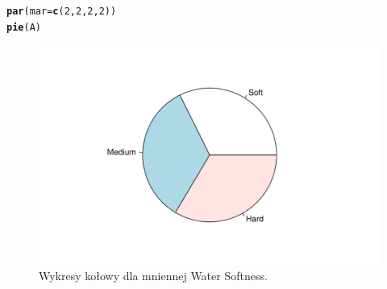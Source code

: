 \documentclass[12pt]{mwart}\usepackage[]{graphicx}\usepackage[]{color}
\makeatletter
\def\maxwidth{ %
  \ifdim\Gin@nat@width>\linewidth
    \linewidth
  \else
    \Gin@nat@width
  \fi
}
\newcommand{\hlnum}[1]{\textcolor[rgb]{0.686,0.059,0.569}{#1}}%
\newcommand{\hlstd}[1]{\textcolor[rgb]{0.345,0.345,0.345}{#1}}%
\newcommand{\hlkwc}[1]{\textcolor[rgb]{0.333,0.667,0.333}{#1}}%
\newcommand{\hlkwd}[1]{\textcolor[rgb]{0.737,0.353,0.396}{\textbf{#1}}}%
\newenvironment{kframe}{%
 \def\at@end@of@kframe{}%
 \ifinner\ifhmode%
  \def\at@end@of@kframe{\end{minipage}}%
  \begin{minipage}{\columnwidth}%
 \fi\fi%
 \def\FrameCommand##1{\hskip\@totalleftmargin \hskip-\fboxsep
 \colorbox{shadecolor}{##1}\hskip-\fboxsep
     \hskip-\linewidth \hskip-\@totalleftmargin \hskip\columnwidth}%
 \MakeFramed {\advance\hsize-\width
   \@totalleftmargin\z@ \linewidth\hsize
   \@setminipage}}%
 {\par\unskip\endMakeFramed%
 \at@end@of@kframe}
\newenvironment{knitrout}{}{} %
\makeatother
\begin{document}
\begin{knitrout}
\color{fgcolor}\begin{kframe}
\begin{alltt}
\hlkwd{par}\hlstd{(}\hlkwc{mar} \hlstd{=} \hlkwd{c}\hlstd{(}\hlnum{2}\hlstd{,} \hlnum{2}\hlstd{,} \hlnum{2}\hlstd{,} \hlnum{2}\hlstd{))}
\hlkwd{pie}\hlstd{(A)}
\end{alltt}
\end{kframe}\begin{figure}[H]
\includegraphics[width=\maxwidth]{figure/r_fig_2-1} \caption{\label{fig:2}Wykresy kołowy dla mniennej Water Softness.}\label{fig:r fig_2}
\end{figure}

\end{knitrout}
\end{document}

